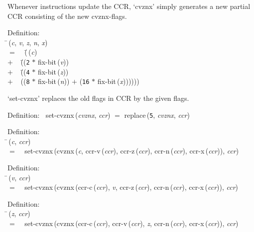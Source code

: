  Whenever instructions update the CCR, `cvznx' simply generates a new partial
 CCR consisting of the new cvznx-flags.
\begin{tabbing}{\sc Definition}: \\  
\=\,({\it{c\/}}, {\it{v\/}}, {\it{z\/}}, {\it{n\/}}, {\it{x\/}}) \\ 
$=$$\;\;\;\;$(\=\,({\it{c\/}}) \\ 
$+$$\;\;\;\;$(\=\+({\tt{2}} $*$ {\rm{fix-bit}}\,({\it{v\/}})) \\ 
$+$$\;\;\;\;$(\=\+({\tt{4}} $*$ {\rm{fix-bit}}\,({\it{z\/}})) \\ 
$+$$\;\;\;\;$(({\tt{8}} $*$ {\rm{fix-bit}}\,({\it{n\/}})) $+$ ({\tt{16}} $*$ {\rm{fix-bit}}\,({\it{x\/}}))))\-)\-)\-\-
\end{tabbing}

 `set-cvznx' replaces the old flags in CCR by the given flags.
\begin{tabbing}{\sc Definition}:$\;\;$
{\rm{set-cvznx}}\,({\it{cvznx\/}}, {\it{ccr\/}}) $=$ {\rm{replace}}\,({\tt{5}}, {\it{cvznx\/}}, {\it{ccr\/}})
\end{tabbing}

\begin{tabbing}{\sc Definition}: \\  
\=\,({\it{c\/}}, {\it{ccr\/}}) \\ 
$=$$\;\;\;\;${\rm{set-cvznx}}\,({\rm{cvznx}}\,({\it{c\/}}, {\rm{ccr-v}}\,({\it{ccr\/}}), {\rm{ccr-z}}\,({\it{ccr\/}}), {\rm{ccr-n}}\,({\it{ccr\/}}), {\rm{ccr-x}}\,({\it{ccr\/}})), {\it{ccr\/}})\-
\end{tabbing}

\begin{tabbing}{\sc Definition}: \\  
\=\,({\it{v\/}}, {\it{ccr\/}}) \\ 
$=$$\;\;\;\;${\rm{set-cvznx}}\,({\rm{cvznx}}\,({\rm{ccr-c}}\,({\it{ccr\/}}), {\it{v\/}}, {\rm{ccr-z}}\,({\it{ccr\/}}), {\rm{ccr-n}}\,({\it{ccr\/}}), {\rm{ccr-x}}\,({\it{ccr\/}})), {\it{ccr\/}})\-
\end{tabbing}

\begin{tabbing}{\sc Definition}: \\  
\=\,({\it{z\/}}, {\it{ccr\/}}) \\ 
$=$$\;\;\;\;${\rm{set-cvznx}}\,({\rm{cvznx}}\,({\rm{ccr-c}}\,({\it{ccr\/}}), {\rm{ccr-v}}\,({\it{ccr\/}}), {\it{z\/}}, {\rm{ccr-n}}\,({\it{ccr\/}}), {\rm{ccr-x}}\,({\it{ccr\/}})), {\it{ccr\/}})\-
\end{tabbing}

